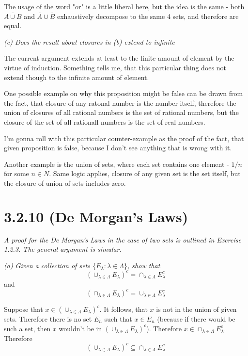 \documentclass[11pt,oneside,titlepage]{book}
\begin{document}
The usage of the word "or" is a little liberal here, but the idea is the same - both
$\overline{A \cup B}$ and $\overline A \cup \overline B$ exhaustively decompose to the same
4 sets, and therefore are equal.

\textit{(c) Does the result about closures in (b) extend to infinite }

The current argument extends at least to the finite amount of element by the virtue of
induction. Something tells me, that this particular thing does not extend though to the
infinite amount of element.

One possible example on why this proposition might be false can be drawn
from the fact, that closure of any
ratonal number is the number itself, therefore the union of closures of all rational numbers is
the set of rational numbers, but the closure of the set of all rationall numbers is the
set of real numbers.

I'm gonna roll with this particular counter-example as the proof of the fact, that given
proposition is false, because I don't see anything that is wrong with it.

Another example  is the union of sets, where each set contains one element - $1/n$ for
some $n \in N$. Same logic applies, closure of any given set is the set itself, but
the closure of union of sets includes zero.


\section*{3.2.10 (De Morgan's Laws)}
\textit{A proof for the De Morgan's Laws in the case of two sets is outlined in Exercise 1.2.3.
  The general argument is simular.}

\textit{(a) Given a collection of sets $\{E_\lambda: \lambda \in  \Lambda\}$, show that }
$$\left(\cup_{\lambda \in \Lambda} E_\lambda \right)^c = \cap_{\lambda \in \Lambda} E_\lambda^c$$
and
$$\left(\cap_{\lambda \in \Lambda} E_\lambda \right)^c = \cup_{\lambda \in \Lambda} E_\lambda^c$$

Suppose that $x \in \left(\cup_{\lambda \in \Lambda} E_\lambda \right)^c$. It
follows, that $x$ is not in the union of given sets. Therefore there is no
set $E_n$ such that $x \in E_n$ (because if there would be such a set, then $x$
wouldn't be in $\left(\cup_{\lambda \in \Lambda} E_\lambda \right)^c$).
Therefore $x \in \cap_{\lambda \in \Lambda} E_\lambda^c$. Therefore 
$$\left(\cup_{\lambda \in \Lambda} E_\lambda \right)^c \subseteq \cap_{\lambda \in \Lambda} E_\lambda^c$$
\end{document}
